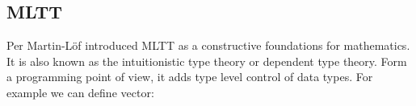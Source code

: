 \begin{code}%
\>[0]\AgdaSpace{}%
\AgdaSymbol{:}\AgdaSpace{}%
\AgdaSpace{}%
\AgdaSpace{}%
\<%
\\
\>[0]\AgdaSpace{}%
\AgdaSpace{}%
\AgdaSymbol{=}\AgdaSpace{}%
\<%
\\
\>[0]\AgdaSpace{}%
\AgdaSymbol{(}\AgdaSpace{}%
\AgdaSymbol{)}\AgdaSpace{}%
\AgdaSymbol{=}\AgdaSpace{}%
\<%
\\
\>[0]\AgdaSpace{}%
\AgdaSymbol{(}\AgdaSpace{}%
\AgdaSymbol{(}\AgdaSpace{}%
\AgdaSymbol{))}\AgdaSpace{}%
\AgdaSymbol{=}\AgdaSpace{}%
\AgdaSpace{}%
\<%
\end{code}

\subsection*{MLTT}

Per Martin-L\"{o}f introduced MLTT as a constructive foundations for mathematics. It is also known as the intuitionistic type theory or dependent type theory. Form a programming point of view, it adds type level control of data types. For example we can define vector:

\begin{code}%
\>[0]\AgdaSpace{}%
\AgdaSpace{}%
\AgdaSymbol{(}\AgdaSpace{}%
\AgdaSymbol{:}\AgdaSpace{}%
\AgdaSymbol{)}\AgdaSpace{}%
\AgdaSymbol{:}\AgdaSpace{}%
\AgdaSpace{}%
\AgdaSpace{}%
\AgdaSpace{}%
\<%
\\
\>[0][@{}l@{\AgdaIndent{0}}]%
\>[2]\AgdaInductiveConstructor{[]}\AgdaSpace{}%
\AgdaSymbol{:}\AgdaSpace{}%
\AgdaSpace{}%
\AgdaSpace{}%
\<%
\\
%
\>[2]\AgdaSpace{}%
\AgdaSymbol{:}\AgdaSpace{}%
\AgdaSymbol{\{}\AgdaSpace{}%
\AgdaSymbol{:}\AgdaSpace{}%
\AgdaSymbol{\}}\AgdaSpace{}%
\AgdaSpace{}%
\AgdaSpace{}%
\AgdaSpace{}%
\AgdaSpace{}%
\AgdaSpace{}%
\AgdaSpace{}%
\AgdaSpace{}%
\AgdaSpace{}%
\AgdaSpace{}%
\AgdaSymbol{(}\AgdaSpace{}%
\AgdaSymbol{)}\<%
\end{code}

